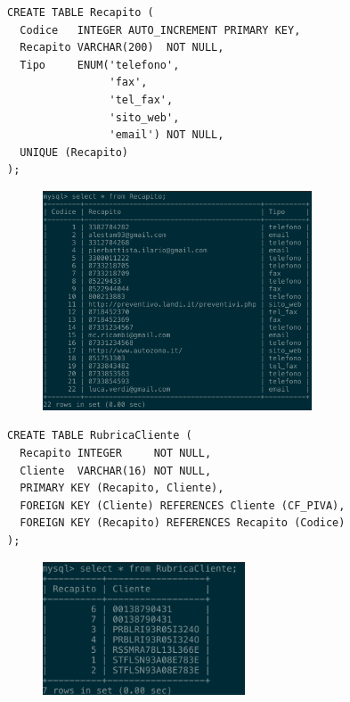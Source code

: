     \begin{lstlisting}
CREATE TABLE Recapito (
  Codice   INTEGER AUTO_INCREMENT PRIMARY KEY,
  Recapito VARCHAR(200)  NOT NULL,
  Tipo     ENUM('telefono',
                'fax',
                'tel_fax',
                'sito_web',
                'email') NOT NULL,
  UNIQUE (Recapito)
);
    \end{lstlisting}
    \begin{figure}[H]
      \centering
      \includegraphics[width=8cm]{images/screenshots/schema/recapito.png}
    \end{figure}

    \begin{lstlisting}
CREATE TABLE RubricaCliente (
  Recapito INTEGER     NOT NULL,
  Cliente  VARCHAR(16) NOT NULL,
  PRIMARY KEY (Recapito, Cliente),
  FOREIGN KEY (Cliente) REFERENCES Cliente (CF_PIVA),
  FOREIGN KEY (Recapito) REFERENCES Recapito (Codice)
);
    \end{lstlisting}
    \begin{figure}[H]
      \centering
      \includegraphics[width=6cm]{images/screenshots/schema/rubrica_cliente.png}
    \end{figure}

